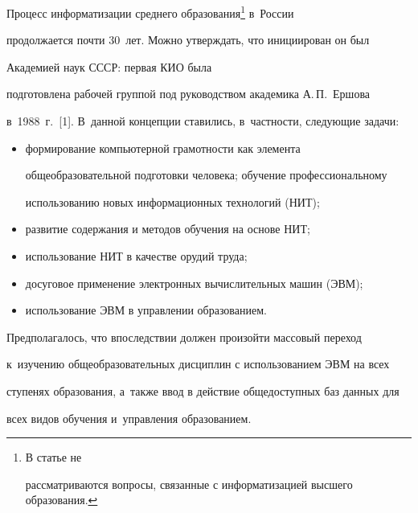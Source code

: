 







      \thispagestyle{headings}





     Процесс информатизации среднего образования\footnote[4]{В статье не


рассматриваются вопросы, связанные с информатизацией высшего образования.} в~России


продолжается почти 30~лет. Можно утверждать, что инициирован он был


Академией наук СССР: первая КИО была


подготовлена рабочей группой под руководством академика А.\,П.~Ершова


в~1988~г.~[1]. В~данной концепции ставились, в~частности, следующие задачи:


     \begin{itemize}


\item формирование компьютерной грамотности как элемента


общеобразовательной подготовки человека; обучение профессиональному


использованию новых информационных технологий (НИТ);


\item развитие содержания и методов обучения на основе НИТ;


\item использование НИТ в качестве орудий труда;


\item досуговое применение электронных вычислительных машин (ЭВМ);


\item использование ЭВМ в управлении образованием.


\end{itemize}





     Предполагалось, что впоследствии должен произойти массовый переход


к~изучению общеобразовательных дисциплин с использованием ЭВМ на всех


ступенях образования, а~также ввод в действие общедоступных баз данных для


всех видов обучения и~управления образованием.





